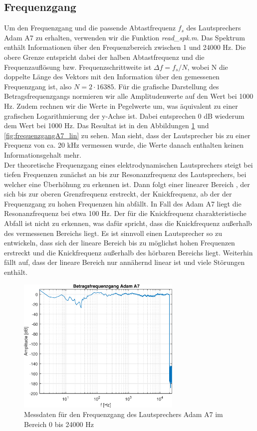 \subsection{Frequenzgang}
\label{subsec:b}
Um den Frequenzgang und die passende Abtastfrequenz $f_s$ des Lautsprechers Adam A7 zu erhalten, verwenden wir die Funktion \textit{read\_spk.m}.
Das Spektrum enthält Informationen über den Frequenzbereich zwischen 1 und 24000 Hz.
Die obere Grenze entspricht dabei der halben Abtastfrequenz und die Frequenzauflösung bzw. Frequenzschrittweite ist $\Delta f = f_s / N$, wobei N die doppelte Länge des Vektors mit den Information über den gemessenen Frequenzgang ist, also $N = 2 \cdot 16385$.
Für die grafische Darstellung des Betragsfrequenzgangs normieren wir alle Amplitudenwerte auf den Wert bei 1000 Hz.
Zudem rechnen wir die Werte in Pegelwerte um, was äquivalent zu einer grafischen Logarithmierung der y-Achse ist.
Dabei entsprechen 0 dB wiederum dem Wert bei 1000 Hz.
Das Resultat ist in den Abbildungen \ref{fig:frequenzgangA7} und \ref{fig:frequenzgangA7_lin} zu sehen. 
Man sieht, dass der Lautsprecher bis zu einer Frequenz von ca. 20 kHz vermessen wurde, die Werte danach enthalten keinen Informationsgehalt mehr.\\
Der theoretische Frequenzgang eines elektrodynamischen Lautsprechers steigt bei tiefen Frequenzen zunächst an bis zur Resonanzfrequenz des Lautsprechers, bei welcher eine Überhöhung zu erkennen ist.
Dann folgt einer linearer Bereich , der sich bis zur  oberen Grenzfrequenz erstreckt, der Knickfrequenz, ab der der Frequenzgang zu hohen Frequenzen hin abfällt. 
In Fall des Adam A7 liegt die Resonanzfrequenz bei etwa 100 Hz.
Der für die Knickfrequenz charakteristische Abfall ist nicht zu erkennen, was dafür spricht, dass die Knickfrequenz außerhalb des vermessenen Bereichs liegt.
Es ist sinnvoll einen Lautsprecher so zu entwickeln, dass sich der lineare Bereich bis zu möglichst hohen Frequenzen erstreckt und die Knickfrequenz außerhalb des hörbaren Bereichs liegt.
Weiterhin fällt auf, dass der lineare Bereich nur annähernd linear ist und viele Störungen enthält.\\

\begin{figure}[H]
        \centering
        \includegraphics[width=0.7\textwidth]{Figures/frequenzgangA7.eps}
        \caption{Messdaten für den Frequenzgang des Lautsprechers Adam A7 im Bereich 0 bis 24000 Hz}
        \label{fig:frequenzgangA7}
\end{figure}

